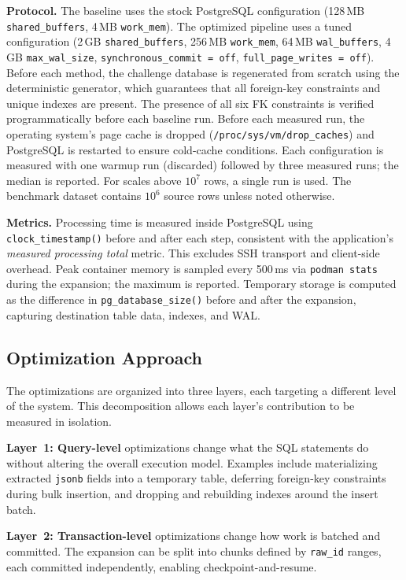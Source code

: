 \documentclass[journal]{IEEEtran}
\begin{document}
\textbf{Protocol.}
The baseline uses the stock PostgreSQL configuration (128\,MB \texttt{shared\_buffers}, 4\,MB \texttt{work\_mem}).
The optimized pipeline uses a tuned configuration (2\,GB \texttt{shared\_buffers}, 256\,MB \texttt{work\_mem}, 64\,MB \texttt{wal\_buffers}, 4\,GB \texttt{max\_wal\_size}, \texttt{synchronous\_commit\,=\,off}, \texttt{full\_page\_writes\,=\,off}).
Before each method, the challenge database is regenerated from scratch using the deterministic generator, which guarantees that all foreign-key constraints and unique indexes are present.
The presence of all six FK constraints is verified programmatically before each baseline run.
Before each measured run, the operating system's page cache is dropped (\texttt{/proc/sys/vm/drop\_caches}) and PostgreSQL is restarted to ensure cold-cache conditions.
Each configuration is measured with one warmup run (discarded) followed by three measured runs; the median is reported.
For scales above $10^7$ rows, a single run is used.
The benchmark dataset contains $10^6$ source rows unless noted otherwise.

\textbf{Metrics.}
Processing time is measured inside PostgreSQL using \texttt{clock\_timestamp()} before and after each step, consistent with the application's \emph{measured processing total} metric.
This excludes SSH transport and client-side overhead.
Peak container memory is sampled every 500\,ms via \texttt{podman stats} during the expansion; the maximum is reported.
Temporary storage is computed as the difference in \texttt{pg\_database\_size()} before and after the expansion, capturing destination table data, indexes, and WAL.

\subsection{Optimization Approach}
\label{sec:framework}

The optimizations are organized into three layers, each targeting a different level of the system.
This decomposition allows each layer's contribution to be measured in isolation.

\textbf{Layer~1: Query-level} optimizations change what the SQL statements do without altering the overall execution model.
Examples include materializing extracted \texttt{jsonb} fields into a temporary table, deferring foreign-key constraints during bulk insertion, and dropping and rebuilding indexes around the insert batch.

\textbf{Layer~2: Transaction-level} optimizations change how work is batched and committed.
The expansion can be split into chunks defined by \texttt{raw\_id} ranges, each committed independently, enabling checkpoint-and-resume.
\end{document}
